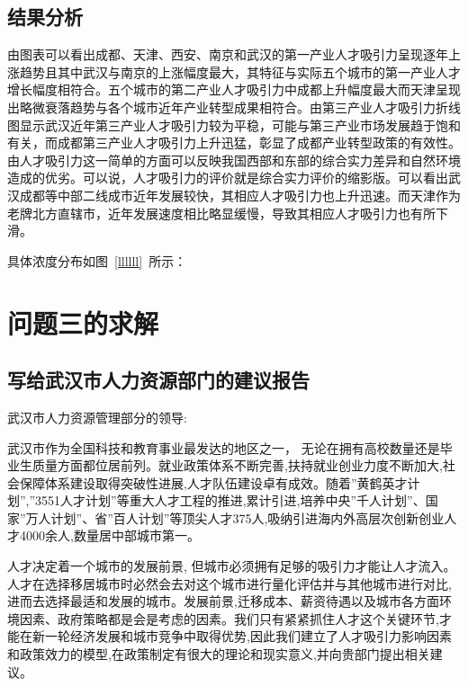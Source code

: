 \documentclass{whutmod}
\begin{document}
	\subsection{结果分析}
	由图表可以看出成都、天津、西安、南京和武汉的第一产业人才吸引力呈现逐年上涨趋势且其中武汉与南京的上涨幅度最大，其特征与实际五个城市的第一产业人才增长幅度相符合。五个城市的第二产业人才吸引力中成都上升幅度最大而天津呈现出略微衰落趋势与各个城市近年产业转型成果相符合。由第三产业人才吸引力折线图显示武汉近年第三产业人才吸引力较为平稳，可能与第三产业市场发展趋于饱和有关，而成都第三产业人才吸引力上升迅猛，彰显了成都产业转型政策的有效性。由人才吸引力这一简单的方面可以反映我国西部和东部的综合实力差异和自然环境造成的优劣。可以说，人才吸引力的评价就是综合实力评价的缩影版。可以看出武汉成都等中部二线成市近年发展较快，其相应人才吸引力也上升迅速。而天津作为老牌北方直辖市，近年发展速度相比略显缓慢，导致其相应人才吸引力也有所下滑。



	
具体浓度分布如图~\ref{llllll}~所示：


	\section{问题三的求解}
	
	
	\subsection{写给武汉市人力资源部门的建议报告}
	
武汉市人力资源管理部分的领导:

武汉市作为全国科技和教育事业最发达的地区之一， 无论在拥有高校数量还是毕业生质量方面都位居前列。就业政策体系不断完善,扶持就业创业力度不断加大,社会保障体系建设取得突破性进展,人才队伍建设卓有成效。随着”黄鹤英才计划”,”3551人才计划”等重大人才工程的推进,累计引进,培养中央”千人计划”、国家”万人计划”、省”百人计划”等顶尖人才375人,吸纳引进海内外高层次创新创业人才4000余人,数量居中部城市第一。

人才决定着一个城市的发展前景, 但城市必须拥有足够的吸引力才能让人才流入。人才在选择移居城市时必然会去对这个城市进行量化评估并与其他城市进行对比, 进而去选择最适和发展的城市。发展前景,迁移成本、薪资待遇以及城市各方面环境因素、政府策略都是会是考虑的因素。我们只有紧紧抓住人才这个关键环节,才能在新一轮经济发展和城市竞争中取得优势,因此我们建立了人才吸引力影响因素和政策效力的模型,在政策制定有很大的理论和现实意义,并向贵部门提出相关建议。
\end{document}
